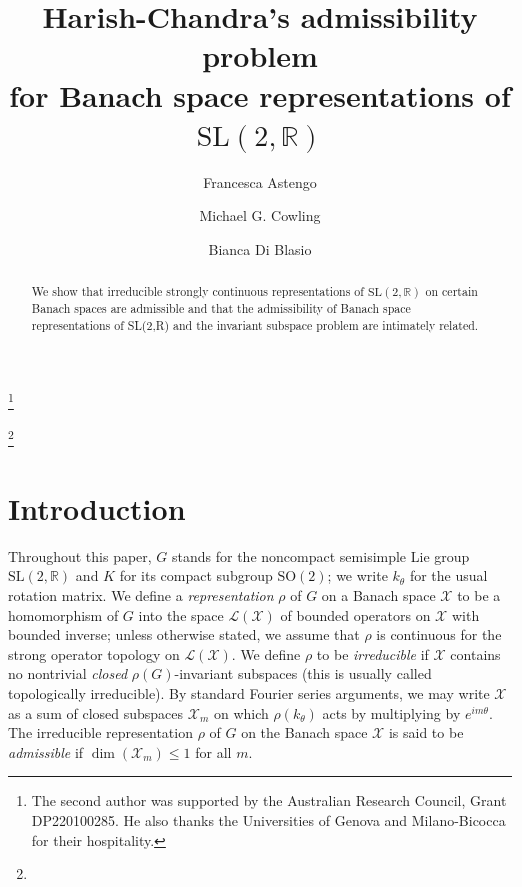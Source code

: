 \documentclass[12pt,a4paper]{amsart}
\theoremstyle{definition}
\theoremstyle{remark}
\numberwithin{equation}{section}
\newcommand{\R}{\mathbb{R}}
\newcommand{\Ban}{\mathcal{X}}
\newcommand{\Lin}{\mathcal{L}}
\newcommand{\rep}{\rho}
\begin{document}
\title[Admissibility of Banach representations]{Harish-Chandra's admissibility problem \\ for Banach space representations of $\mathrm{SL}(2,\R)$}%

\author{Francesca Astengo}
\address{Dipartimento di Matematica, Dipartimento di Eccellenza 2023--2027, Universit\`a di Genova, Via Dodecaneso 35, 16146 Genova, Italy} 

\author{Michael G. Cowling}
\thanks{The second author was supported by the Australian Research Council, Grant DP220100285.
He also thanks the Universities of Genova and Milano-Bicocca for their hospitality.}
\address{School of Mathematics and Statistics, University of New South Wales, Sydney  NSW 2052, Australia } 

\author{Bianca Di Blasio}
\thanks{}
\address{Dipartimento di Matematica e Applicazioni, Universit\`a di Milano-Bicocca, Via Cozzi 53, 20125 Milano, Italy } 
%
%
\keywords{}%


\begin{abstract}{%
We show that irreducible strongly continuous representations of $\mathrm{SL}(2,\mathbb{R})$ on certain Banach spaces are admissible and that the admissibility of Banach space representations of SL(2,R) and the invariant subspace problem are intimately related.}
\end{abstract}

\maketitle
\section{Introduction}

Throughout this paper, $G$ stands for the noncompact semisimple Lie group $\mathrm{SL}(2,\R)$ and $K$ for its compact subgroup $\mathrm{SO}(2)$; we write $k_\theta$ for the usual rotation matrix.
We define a \emph{representation} $\rep$ of $G$ on a Banach space $\Ban$ to be a homomorphism of $G$ into the space $\Lin(\Ban)$ of bounded operators on $\Ban$ with bounded inverse; unless otherwise stated, we assume that $\rep$ is continuous for the strong operator topology on $\Lin(\Ban)$. 
We define $\rep$ to be \emph{irreducible} if $\Ban$ contains no nontrivial \emph{closed} $\rep(G)$-invariant subspaces (this is usually called topologically irreducible).
By standard Fourier series arguments, we may write $\Ban$ as a sum of closed subspaces $\Ban_m$ on which $\rep(k_\theta)$ acts by multiplying by $e^{im\theta}$.
The  irreducible representation $\rep$ of $G$ on the Banach space $\Ban$ is said to be \emph{admissible} if $\dim(\Ban_m) \leq 1$ for all $m$.
\end{document}
